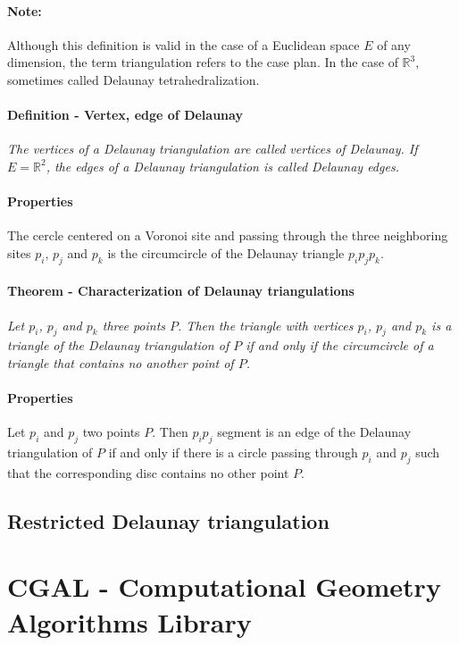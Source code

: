 \paragraph{Note:}
{
Although this definition is valid in the case of a Euclidean space $E$ of any dimension, the term triangulation refers to the case plan. In the case of $\mathbb{R}^{3}$, sometimes called Delaunay tetrahedralization.
}

\paragraph{Definition - Vertex, edge of Delaunay}
{
\it The vertices of a Delaunay triangulation are called vertices of Delaunay. If $E = \mathbb{R}^{2}$, the edges of a Delaunay triangulation is called Delaunay edges.
}

\paragraph{Properties}
{
The cercle centered on a Voronoi site and passing through the three neighboring sites $p_{i}$, $p_{j}$ and $p_{k}$ is the circumcircle of the Delaunay triangle $p_{i}p_{j}p_{k}$.
}


\paragraph{Theorem - Characterization of Delaunay triangulations}
{
\it Let $p_{i}$, $p_{j}$ and $p_{k}$ three points $P$. Then the triangle with vertices $p_{i}$, $p_{j}$ and $p_{k}$ is a triangle of the Delaunay triangulation of $P$ if and only if the circumcircle of a triangle that contains no another point of $P$.
}

\paragraph{Properties}
{
Let $p_{i}$ and $p_{j}$ two points $P$. Then $p_{i}p_{j}$ segment is an edge of the Delaunay triangulation of $P$ if and only if there is a circle passing through $p_{i}$ and $p_{j}$ such that the corresponding disc contains no other point $P$.
}

\subsection{Restricted Delaunay triangulation}

\section{CGAL - Computational Geometry Algorithms Library}


